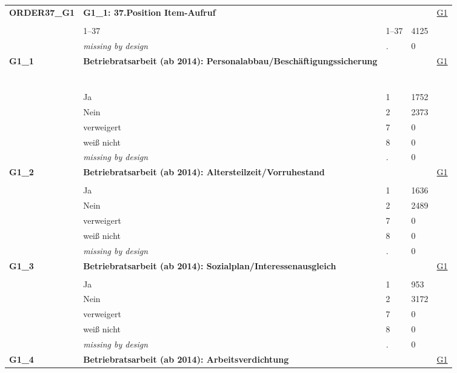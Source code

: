 \begin{longtable}{| L{2.65cm} | L{8cm} | C{1.5cm} | R{1.25cm} | C{2.25cm}  |}
   \midrule
\textbf{ORDER37\_G1}\label{var:ORDER37:G1} & \textbf{G1\_1: 37.Position Item-Aufruf} &  &  & \hyperref[G1]{G1} \\ 
   &  &  &  &  \\ 
   & 1--37 & 1--37 & 4125 &  \\ 
   & \textit{missing by design} & \textit{.} & 0 &  \\ 
   \midrule
\textbf{G1\_1}\label{var:G1:1} & \textbf{Betriebratsarbeit (ab 2014): Personalabbau/Beschäftigungssicherung} &  &  & \hyperref[G1]{G1} \\ 
   & \protect\subsection[Variablen G1\_1 bis G1\_37]{} &  &  &  \\ 
   & Ja & 1 & 1752 &  \\ 
   & Nein & 2 & 2373 &  \\ 
   & verweigert & 7 & 0 &  \\ 
   & weiß nicht & 8 & 0 &  \\ 
   & \textit{missing by design} & \textit{.} & 0 &  \\ 
   \midrule
\textbf{G1\_2}\label{var:G1:2} & \textbf{Betriebratsarbeit (ab 2014): Altersteilzeit/Vorruhestand} &  &  & \hyperref[G1]{G1} \\ 
   &  &  &  &  \\ 
   & Ja & 1 & 1636 &  \\ 
   & Nein & 2 & 2489 &  \\ 
   & verweigert & 7 & 0 &  \\ 
   & weiß nicht & 8 & 0 &  \\ 
   & \textit{missing by design} & \textit{.} & 0 &  \\ 
   \midrule
\textbf{G1\_3}\label{var:G1:3} & \textbf{Betriebratsarbeit (ab 2014): Sozialplan/Interessenausgleich} &  &  & \hyperref[G1]{G1} \\ 
   &  &  &  &  \\ 
   & Ja & 1 & 953 &  \\ 
   & Nein & 2 & 3172 &  \\ 
   & verweigert & 7 & 0 &  \\ 
   & weiß nicht & 8 & 0 &  \\ 
   & \textit{missing by design} & \textit{.} & 0 &  \\ 
   \midrule
\textbf{G1\_4}\label{var:G1:4} & \textbf{Betriebratsarbeit (ab 2014): Arbeitsverdichtung} &  &  & \hyperref[G1]{G1} \\ 

\end{longtable}
